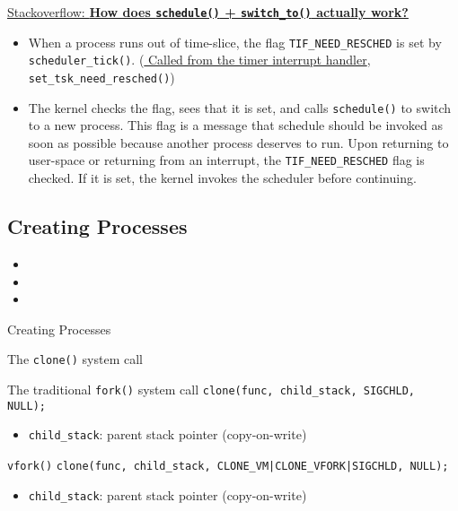 \href{http://stackoverflow.com/questions/6525905/how-does-scheduleswitch-to-functions-from-linux-kernel-actually-work}{Stackoverflow:
  \textbf{How does \texttt{schedule()} + \texttt{switch\_to()} actually work?}}
\begin{itemize}
\item When a process runs out of time-slice, the flag \texttt{TIF\_NEED\_RESCHED} is set by
  \texttt{scheduler\_tick()}. (\href{http://http://lxr.linux.no/linux+v2.6.11/arch/i386/}{
    Called from the timer interrupt handler}, \texttt{set\_tsk\_need\_resched()})
\item The kernel checks the flag, sees that it is set, and calls \texttt{schedule()} to
  switch to a new process. This flag is a message that schedule should be invoked as soon
  as possible because another process deserves to run. Upon returning to user-space or
  returning from an interrupt, the \texttt{TIF\_NEED\_RESCHED} flag is checked. If it is
  set, the kernel invokes the scheduler before continuing.
\end{itemize}

  
\subsection{Creating Processes}

\begin{itemize}
\item {}
\item {}
\item {}
\end{itemize}

\begin{frame}[fragile=singleslide]{Creating Processes}
  \begin{block}{The \texttt{clone()} system call}
    \begin{center}
    \end{center}
  \end{block}
  \begin{block}{The traditional \texttt{fork()} system call}
    \texttt{clone(func, child_stack, SIGCHLD, NULL);}
    \begin{itemize}
    \item \texttt{child\_stack}: parent stack pointer (copy-on-write)
    \end{itemize}
  \end{block}
  \begin{block}{\texttt{vfork()}}
    \texttt{clone(func, child_stack, CLONE_VM|CLONE_VFORK|SIGCHLD, NULL);}
    \begin{itemize}
    \item \texttt{child\_stack}: parent stack pointer (copy-on-write)
    \end{itemize}
  \end{block}
\end{frame}

